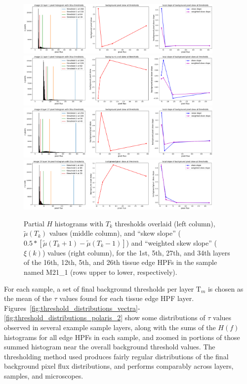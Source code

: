 \documentclass[letterpaper,11pt]{article}
\newcommand{\Tau}{\mathrm{T}}
\begin{document}
\begin{figure}[!ht]
\centering
\includegraphics[width=0.9\textwidth]{images/masking/thresholds_image_15_layer_1}
\includegraphics[width=0.9\textwidth]{images/masking/thresholds_image_11_layer_5}
\includegraphics[width=0.9\textwidth]{images/masking/thresholds_image_4_layer_27}
\includegraphics[width=0.9\textwidth]{images/masking/thresholds_image_25_layer_34}
\caption{\footnotesize Partial $H$ histograms with $T_{k}$ thresholds overlaid (left column), $\widetilde{\mu}(T_{k})$ values (middle column), and ``skew slope'' ($0.5*\left[\widetilde{\mu}(T_{k}+1) - \widetilde{\mu}(T_{k}-1)\right]$) and ``weighted skew slope'' ($\xi(k)$) values (right column), for the 1st, 5th, 27th, and 34th layers of the 16th, 12th, 5th, and 26th tissue edge HPFs in the sample named M21\_1 (rows upper to lower, respectively).}
\label{fig:histograms_with_otsu_thresholds}
\end{figure}

For each sample, a set of final background thresholds per layer $\Tau_{m}$ is chosen as the mean of the $\tau$ values found for each tissue edge HPF layer. Figures~\ref{fig:threshold_distributions_vectra}-\ref{fig:threshold_distributions_polaris_2} show some distributions of $\tau$ values observed in several example sample layers, along with the sums of the $H(f)$ histograms for all edge HPFs in each sample, and zoomed in portions of those summed histogram near the overall background threshold values. The thresholding method used produces fairly regular distributions of the final background pixel flux distributions, and performs comparably across layers, samples, and microscopes. 
\end{document}
